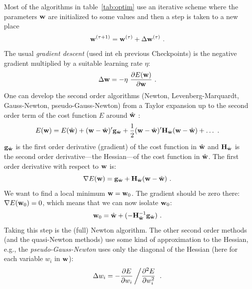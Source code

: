 \documentclass[12pt]{article}
\begin{document}
%
Most of the algorithms in table~\ref{tab:optim} use an iterative
scheme where the parameters ${\bf w}$ are initialized to some
values and then a step is taken to a new place
\begin{equation}
  \label{eq:step}
  {\bf w}^{(\tau+1)} = {\bf w}^{(\tau)} + \Delta {\bf w}^{(\tau)} \ .
\end{equation}
The usual {\em gradient descent} (used int eh previous Checkpoints) is the
negative gradient multiplied by a suitable learning rate $\eta$:
\begin{equation}
  \label{eq:backprob}
  \Delta {\bf w} = - \eta\ \frac{\partial E({\bf w})}{\partial {\bf w}} \ .
\end{equation}
One can develop the second order algorithms (Newton,
Levenberg-Marquardt, Gauss-Newton, pseudo-Gauss-Newton) from a
Taylor expansion up to the second order term of the cost function $E$
around $\hat{\bf w}$ :
\begin{equation}
  \label{eq:taylor}
  E({\bf w}) = E(\hat{\bf w}) + ({\bf w} - \hat{\bf w})' {\bf
    g}_{\hat{\bf w}} +
  \frac{1}{2} ({\bf w} - \hat{\bf w})' {\bf H}_{\hat{\bf w}} ({\bf w}
    - \hat{\bf w})
    + \ldots \ .
\end{equation}
${\bf g}_{\hat{\bf w}}$ is the first order derivative (gradient)
of the cost function in $\hat{\bf w}$ and ${\bf H}_{\hat{\bf w}}$
is the second order derivative---the Hessian---of the
cost function in $\hat{\bf w}$. The first order derivative with respect to
${\bf w}$ is:
\begin{equation}
  \label{eq:derivative}
  \nabla E({\bf w}) = {\bf g}_{\hat{\bf w}} + {\bf H}_{\hat{\bf
  w}} ({\bf w} - \hat{\bf w}) \ .
\end{equation}
We want to find a local minimum ${\bf w} = {\bf w}_0$. The
gradient should be zero there: $\nabla E ({\bf w}_0) = 0$, which
means that we can now isolate ${\bf w}_0$:
\begin{equation}
  \label{eq:zero}
  {\bf w}_0 = \hat{\bf w} + (- {\bf H}^{-1}_{\hat{\bf w}} {\bf
  g}_{\hat{\bf w}}) \ .
\end{equation}
Taking this step is the (full) Newton algorithm. The other second
order methods (and the quasi-Newton methods) use some kind of
approximation to the Hessian, e.g., the {\em pseudo-Gauss-Newton}
uses only the diagonal of the Hessian (here for each variable
$w_i$ in ${\bf w}$):
\begin{equation}
  \label{eq:pseudogn}
  \Delta w_i = - \frac{\partial E}{\partial w_i} \left/
  \frac{\partial^2 E}{\partial w_i^2} \right. \ .
\end{equation}
\end{document}
